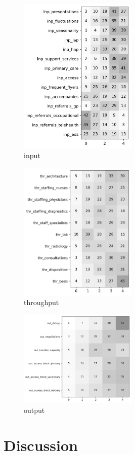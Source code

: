 \documentclass{article}
\begin{document}
\begin{figure}[H]
    \centering
        \includegraphics[width=0.5\textwidth]{../output/plots/input}
        \caption{input}
        \label{fig:input}
\end{figure}

\begin{figure}[H]
    \centering
        \includegraphics[width=0.5\textwidth]{../output/plots/throughput}
        \caption{throughput}
        \label{fig:throughput}
\end{figure}

\begin{figure}[H]
    \centering
        \includegraphics[width=0.5\textwidth]{../output/plots/output}
        \caption{output}
        \label{fig:output}
\end{figure}

\section{Discussion}
\lipsum[5]
\end{document}
